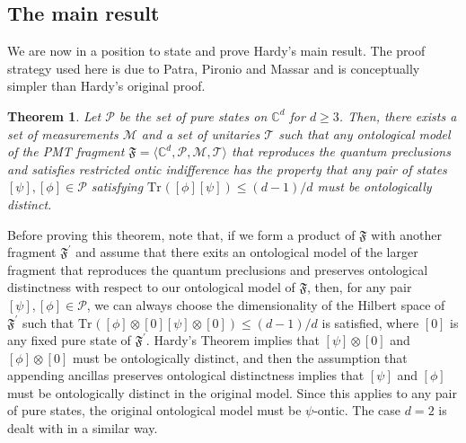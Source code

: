 \documentclass[DIV=calc,paper=a4,fontsize=11pt,twocolumn]{scrartcl} %
\theoremstyle{definition}
\theoremstyle{plain}
\newtheorem{theorem}[definition]{Theorem}
\newcommand{\Proj}[1]{\ensuremath{\left [ #1 \right ]}}
\newcommand{\Tr}[2][]{\ensuremath{\text{Tr}_{#1} \left ( #2 \right )}}
\begin{document}
\subsection{The main result}

\label{HMain}

We are now in a position to state and prove Hardy's main result.  The
proof strategy used here is due to Patra, Pironio and Massar
\cite{Patra2013a} and is conceptually simpler than Hardy's original
proof.

\begin{theorem}
\label{thm:Hardy:hardy}
Let $\mathcal{P}$ be the set of pure states on $\mathbb{C}^d$ for $d
\geq 3$.  Then, there exists a set of measurements $\mathcal{M}$ and
a set of unitaries $\mathcal{T}$ such that any ontological model of
the PMT fragment $\mathfrak{F} = \langle \mathbb{C}^d, \mathcal{P},
\mathcal{M}, \mathcal{T} \rangle$ that reproduces the quantum
preclusions and satisfies restricted ontic indifference has the
property that any pair of states $\Proj{\psi}, \Proj{\phi} \in
\mathcal{P}$ satisfying $\Tr{\Proj{\phi}\Proj{\psi}} \leq (d-1)/d$
must be ontologically distinct.
\end{theorem}

Before proving this theorem, note that, if we form a product of
$\mathfrak{F}$ with another fragment $\mathfrak{F}^{\prime}$ and
assume that there exits an ontological model of the larger fragment
that reproduces the quantum preclusions and preserves ontological
distinctness with respect to our ontological model of $\mathfrak{F}$,
then, for any pair $\Proj{\psi}, \Proj{\phi} \in \mathcal{P}$, we can
always choose the dimensionality of the Hilbert space of
$\mathfrak{F}^{\prime}$ such that $\Tr{\Proj{\phi} \otimes \Proj{0}
  \Proj{\psi} \otimes \Proj{0}} \leq (d-1)/d$ is satisfied, where
$\Proj{0}$ is any fixed pure state of $\mathfrak{F}^{\prime}$.
Hardy's Theorem implies that $\Proj{\psi} \otimes \Proj{0}$ and
$\Proj{\phi} \otimes \Proj{0}$ must be ontologically distinct, and
then the assumption that appending ancillas preserves ontological
distinctness implies that $\Proj{\psi}$ and $\Proj{\phi}$ must be
ontologically distinct in the original model.  Since this applies to
any pair of pure states, the original ontological model must be
$\psi$-ontic.  The case $d=2$ is dealt with in a similar way.
\end{document}
